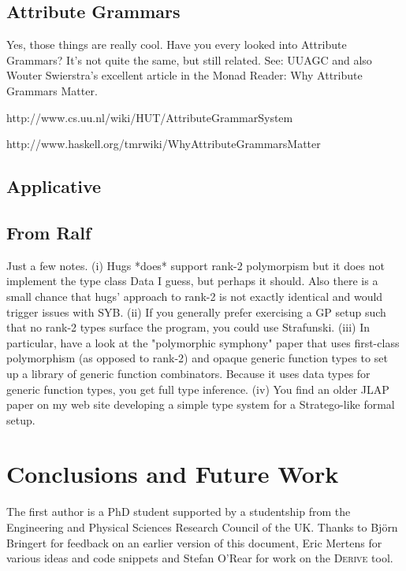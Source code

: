 \documentclass[preprint]{sigplanconf}
\begin{document}
\subsection{Attribute Grammars}

Yes, those things are really cool. Have you every looked into Attribute Grammars? It's not quite the same, but still related. See: UUAGC and also Wouter Swierstra's excellent article in the Monad Reader: Why Attribute Grammars Matter.

http://www.cs.uu.nl/wiki/HUT/AttributeGrammarSystem

http://www.haskell.org/tmrwiki/WhyAttributeGrammarsMatter

\subsection{Applicative}

\subsection{From Ralf}

Just a few notes. (i) Hugs *does* support rank-2 polymorpism but it does not implement the type class Data I guess, but perhaps it should. Also there is a small chance that hugs' approach to rank-2 is not exactly identical and would trigger issues with SYB. (ii) If you generally prefer exercising a GP setup such that no rank-2 types surface the program, you could use Strafunski. (iii) In particular, have a look at the "polymorphic symphony" paper that uses first-class polymorphism (as opposed to rank-2) and opaque generic function types to set up a library of generic function combinators. Because it uses data types for generic function types, you get full type inference. (iv) You find an older JLAP paper on my web site developing a simple type system for a Stratego-like formal setup.

\section{Conclusions and Future Work}

\acks

The first author is a PhD student supported by a studentship from the Engineering and Physical Sciences Research Council of the UK. Thanks to Bj\"{o}rn Bringert for feedback on an earlier version of this document, Eric Mertens for various ideas and code snippets and Stefan O'Rear for work on the \textsc{Derive} tool.



\end{document}
